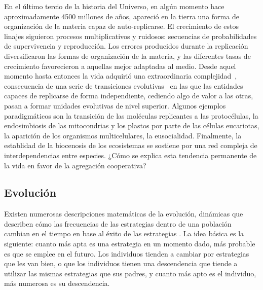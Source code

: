 \documentclass[a4paper,10pt]{article}
\begin{document}
En el último tercio de la historia del Universo, en algún momento hace aproximadamente 4500 millones de años, apareció en la tierra una forma de organización de la materia capaz de auto-replicarse.
El crecimiento de estos linajes siguieron procesos multiplicativos y ruidosos: secuencias de probabilidades de supervivencia y reproducción.
Los errores producidos durante la replicación diversificaron las formas de organización de la materia, y las diferentes tasas de crecimiento favorecieron a aquellas mejor adaptadas al medio.
Desde aquel momento hasta entonces la vida adquirió una extraordinaria complejidad~\cite{barOn2018-biomass}, consecuencia de una serie de transiciones evolutivas~\cite{maynardSmith1995-majorTransitions} en las que las entidades capaces de replicarse de forma independiente, cediendo algo de valor a las otras, pasan a formar unidades evolutivas de nivel superior.
Algunos ejemplos paradigmáticos son la transición de las moléculas replicantes a las protocélulas, la endosimbiosis de las mitocondrias y los plastos por parte de las células eucariotas, la aparición de los organismos multicelulares, la eusocialidad.
Finalmente, la establidad de la biocenosis de los ecosistemas se sostiene por una red compleja de interdependencias entre especies.
¿Cómo se explica esta tendencia permanente de la vida en favor de la agregación cooperativa?

\subsection{Evolución}

Existen numerosas descripciones matemáticas de la evolución, dinámicas que describen cómo las frecuencias de las estrategias dentro de una población cambian en el tiempo en base al éxito de las estrategias \cite{hofbauer2003-evolutionaryGameDynamics}.
La idea básica es la siguiente: cuanto más apta es una estrategia en un momento dado, más probable es que se emplee en el futuro.
Los individuos tienden a cambiar por estrategias que les van bien, o que los individuos tienen una descendencia que tiende a utilizar las mismas estrategias que sus padres, y cuanto más apto es el individuo, más numerosa es su descendencia.
\end{document}

